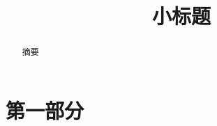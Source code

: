 \documentclass[12pt,hyperref,a4paper,UTF8,fontset=fandol]{ctexart}
\begin{document}
\cover
\thispagestyle{empty} %



\newpage
\begin{abstract}

摘要

\end{abstract}

\vspace{1cm}

\tableofcontents

\newpage

\begin{center}
   \title{ \Huge \textbf{{小标题}}}
\end{center}

\section{第一部分}


\end{document}
